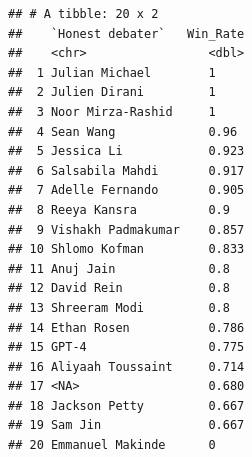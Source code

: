 \documentclass[
]{article}
\newenvironment{Shaded}{\begin{snugshade}}{\end{snugshade}}
\newcommand{\AttributeTok}[1]{\textcolor[rgb]{0.13,0.29,0.53}{#1}}
\newcommand{\CommentTok}[1]{\textcolor[rgb]{0.56,0.35,0.01}{\textit{#1}}}
\newcommand{\FloatTok}[1]{\textcolor[rgb]{0.00,0.00,0.81}{#1}}
\newcommand{\FunctionTok}[1]{\textcolor[rgb]{0.13,0.29,0.53}{\textbf{#1}}}
\newcommand{\NormalTok}[1]{#1}
\newcommand{\OtherTok}[1]{\textcolor[rgb]{0.56,0.35,0.01}{#1}}
\newcommand{\SpecialCharTok}[1]{\textcolor[rgb]{0.81,0.36,0.00}{\textbf{#1}}}
\newcommand{\StringTok}[1]{\textcolor[rgb]{0.31,0.60,0.02}{#1}}
\begin{document}
\begin{verbatim}
## # A tibble: 20 x 2
##    `Honest debater`   Win_Rate
##    <chr>                 <dbl>
##  1 Julian Michael        1    
##  2 Julien Dirani         1    
##  3 Noor Mirza-Rashid     1    
##  4 Sean Wang             0.96 
##  5 Jessica Li            0.923
##  6 Salsabila Mahdi       0.917
##  7 Adelle Fernando       0.905
##  8 Reeya Kansra          0.9  
##  9 Vishakh Padmakumar    0.857
## 10 Shlomo Kofman         0.833
## 11 Anuj Jain             0.8  
## 12 David Rein            0.8  
## 13 Shreeram Modi         0.8  
## 14 Ethan Rosen           0.786
## 15 GPT-4                 0.775
## 16 Aliyaah Toussaint     0.714
## 17 <NA>                  0.680
## 18 Jackson Petty         0.667
## 19 Sam Jin               0.667
## 20 Emmanuel Makinde      0
\end{verbatim}

\begin{Shaded}
\end{Shaded}
\end{document}
